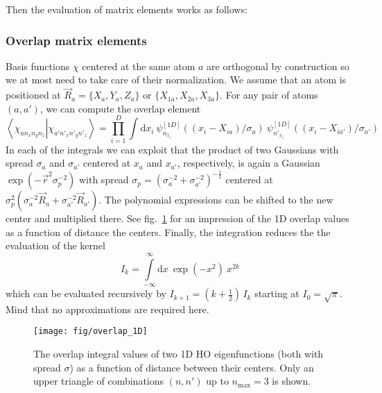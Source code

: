 \documentclass[oribibl]{llncs}
\newcommand{\um}[1]{_{\mathrm{#1}}}
\newcommand{\braket}[2]{\left\langle \left. #1 \right| #2 \right\rangle}
\begin{document}
Then the evaluation of matrix elements works as follows:

\subsubsection{Overlap matrix elements}
Basis functions $\chi$ centered at the same atom $a$ are orthogonal by construction
so we at most need to take care of their normalization.
We assume that an atom is positioned at $\vec R_a = \{ X_a, Y_a, Z_a \}$ or $\{ X_{1a}, X_{2a}, X_{3a} \}$.
For any pair of atoms $(a,a')$, we can compute the overlap element
\begin{equation}
  \braket{ \chi_{a n_x n_y n_z} }{ \chi_{a' n'_x n'_y n'_z} } = \prod_{i=1}^D
  \int\mathrm d x_i \  \psi^{[1D]}_{n_{x_i}}((x_i - X_{ia})/\sigma_a)
                    \  \psi^{[1D]}_{n'_{x_i}}((x_i - X_{ia'})/\sigma_{a'})
  \label{eqn:overlap-factorized}
\end{equation}
In each of the integrals we can exploit that the product 
of two Gaussians with spread $\sigma_a$ and $\sigma_{a'}$ 
centered at $x_a$ and $x_{a'}$, respectively, 
is again a Gaussian $\exp(-\vec r^2 \sigma_p^{-2})$ with spread $\sigma_p = \left(\sigma_a^{-2} + \sigma_{a'}^{-2}\right)^{-\frac12}$
centered at $\sigma_p^2 \left( \sigma_a^{-2} \vec R_a + \sigma_{a'}^{-2} \vec R_{a'} \right)$.
The polynomial expressions can be shifted to the new center and multiplied there.
See fig.~\ref{fig:overlap_1D} for an impression of the 1D overlap values 
as a function of distance the centers.
Finally, the integration reduces the the evaluation of the kernel
\begin{equation}
  I_k = \int\limits_{-\infty}^{\infty} \mathrm d x \  \exp(-x^2) \  x^{2k}
  \label{eqn:gauss-integral-kernel}
\end{equation}
which can be evaluated recursively by $I_{k+1} = (k + \frac12)\,I_k$ starting at $I_0 = \sqrt{\pi}$.
Mind that no approximations are required here.
%
\begin{figure}
  \begin{minipage}[c]{.990\textwidth}
	\texttt{[image: fig/overlap\_1D]} %
  \end{minipage}\hfill
  \begin{minipage}[c]{.009\textwidth}
  \end{minipage}
  \label{fig:overlap_1D}
  \caption{
	The overlap integral values of two 1D \ac{HO} eigenfunctions (both with spread $\sigma$)
	as a function of distance between their centers.
	Only an upper triangle of combinations $(n,n')$ up to $n\um{max} = 3$ is shown.
  }
\end{figure}
%
%
\end{document}

